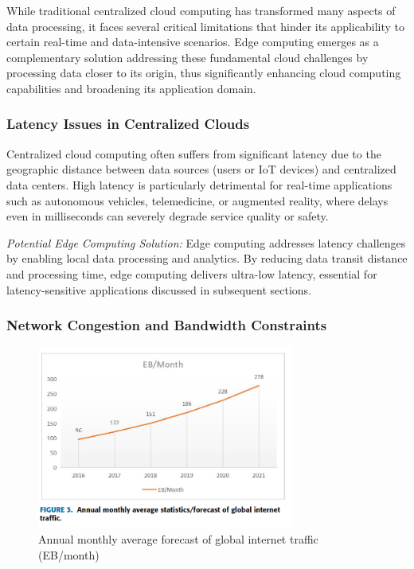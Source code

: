 \documentclass[runningheads]{llncs}
\begin{document}
While traditional centralized cloud computing has transformed many aspects of data processing, it faces several critical limitations that hinder its applicability to certain real-time and data-intensive scenarios. Edge computing emerges as a complementary solution addressing these fundamental cloud challenges by processing data closer to its origin, thus significantly enhancing cloud computing capabilities and broadening its application domain.

\subsubsection{Latency Issues in Centralized Clouds}
Centralized cloud computing often suffers from significant latency due to the geographic distance between data sources (users or IoT devices) and centralized data centers. High latency is particularly detrimental for real-time applications such as autonomous vehicles, telemedicine, or augmented reality, where delays even in milliseconds can severely degrade service quality or safety.

\noindent\textit{Potential Edge Computing Solution:} Edge computing addresses latency challenges by enabling local data processing and analytics. By reducing data transit distance and processing time, edge computing delivers ultra-low latency, essential for latency-sensitive applications discussed in subsequent sections.

\subsubsection{Network Congestion and Bandwidth Constraints}

\begin{figure}[h!]
    \centering
    \includegraphics[width=0.75\textwidth]{IMG/8.png}
    \caption{Annual monthly average forecast of global internet traffic (EB/month)}
    \label{fig:internet_traffic}
    \end{figure}   
\FloatBarrier %
\end{document}
